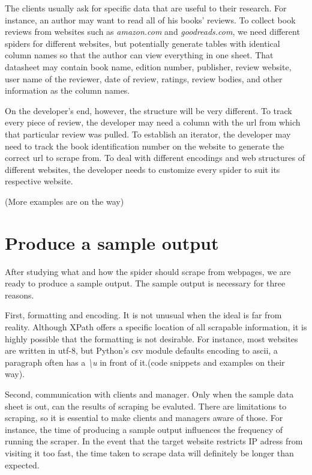 \documentclass[12pt]{report}
\begin{document}
The clients usually ask for specific data that are useful to their research. For instance, an author may want to read all of his books' reviews. To collect book reviews from websites such as \textit{amazon.com} and \textit{goodreads.com}, we need different spiders for different websites, but potentially generate tables with identical column names so that the author can view everything in one sheet. That datasheet may contain book name, edition number, publisher, review website, user name of the reviewer, date of review, ratings, review bodies, and other information as the column names.

On the developer's end, however, the structure will be very different. To track every piece of review, the developer may need a column with the url from which that particular review was pulled. To establish an iterator, the developer may need to track the book identification number on the website to generate the correct url to scrape from. To deal with different encodings and web structures of different websites, the developer needs to customize every spider to suit its respective website.

(More examples are on the way)

\section{Produce a sample output}

After studying what and how the spider should scrape from webpages, we are ready to produce a sample output. The sample output is necessary for three reasons.

First, formatting and encoding. It is not unusual when the ideal is far from reality. Although XPath offers a specific location of all scrapable information, it is highly possible that the formatting is not desirable. For instance, most websites are written in utf-8, but Python's csv module defaults encoding to ascii, a paragraph often has a \textit{\textbackslash u} in front of it.(code snippets and examples on their way).

Second, communication with clients and manager. Only when the sample data sheet is out, can the results of scraping be evaluted. There are limitations to scraping, so it is essential to make clients and managers aware of those. For instance, the time of producing a sample output influences the frequency of running the scraper. In the event that the target website restricts IP adress from visiting it too fast, the time taken to scrape data will definitely be longer than expected.
\end{document}
